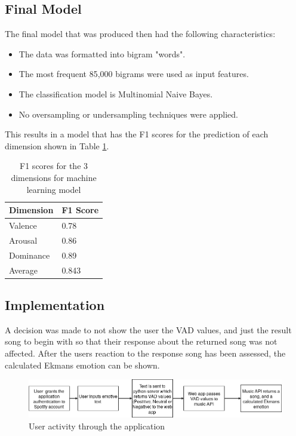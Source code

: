 \pagebreak

\subsection{Final Model}
\label{finalModelSection}
The final model that was produced then had the following characteristics: 

\begin{itemize}
    \item The data was formatted into bigram "words".
    \item The most frequent 85,000 bigrams were used as input features.
    \item The classification model is Multinomial Naive Bayes.
    \item No oversampling or undersampling techniques were applied.
\end{itemize}

This results in a model that has the F1 scores for the prediction of each dimension shown in Table \ref{ML:f1}.

\begin{table}
\centering
\caption{F1 scores for the 3 dimensions for machine learning model}
\begin{tabular}{ |p{3cm}|p{3cm}|}
 \hline
  Dimension & F1 Score \\
 \hline
  Valence & 0.78\\
  Arousal & 0.86 \\
  Dominance & 0.89\\
 \hline
 Average & 0.843\\
 \hline
\end{tabular}
\label{ML:f1}
\end{table}

\pagebreak

\subsection{Implementation}

A decision was made to not show the user the VAD values, and just the result song to begin with so that their response about the returned song was not affected. After the users reaction to the response song has been assessed, the calculated Ekmans emotion can be shown.

\begin{figure}[ht]
\centering
\includegraphics[scale=0.5]{litImgs/interfaceFlow.png}
\caption{User activity through the application}
\label{implementationFlow}
\end{figure}

